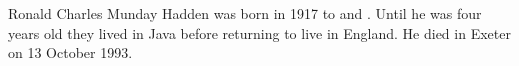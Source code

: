 
Ronald Charles Munday Hadden was born in 1917 to  and .
Until he was four years old they lived in Java before returning to live in England. 
He died in Exeter on 13 October 1993.\cite{RCMHaddenDeath}
